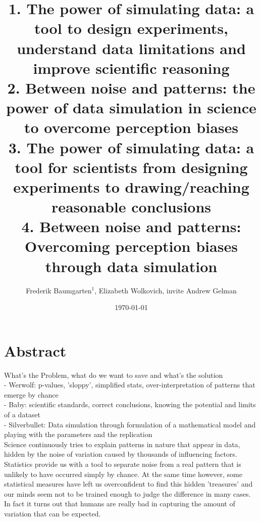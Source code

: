 \documentclass{article}
\begin{document}
\renewcommand{\bibname}{References}%



\title{1. The power of simulating data: a tool to design experiments, understand data limitations and improve scientific reasoning \\%

2. Between noise and patterns: the power of data simulation in science to overcome perception biases\\
3. The power of simulating data: a tool for scientists from designing experiments to drawing/reaching reasonable conclusions\\
4. Between noise and patterns: Overcoming perception biases through data simulation
} 


\date{\today}
\author{Frederik Baumgarten$^1$, Elizabeth Wolkovich, invite Andrew Gelman}
\maketitle 

\section*{Abstract}
What's the Problem, what do we want to save and what's the solution\\
- Werwolf: p-values, 'sloppy', simplified stats, over-interpretation of patterns that emerge by chance\\
- Baby: scientific standards, correct conclusions, knowing the potential and limits of a dataset\\
- Silverbullet: Data simulation through formulation of a mathematical model and playing with the parameters and the replication\\
Science continuously tries to explain patterns in nature that appear in data, hidden by the noise of variation caused by thousands of influencing factors. Statistics provide us with a tool to separate noise from a real pattern that is unlikely to have occurred simply by chance.  At the same time however, some statistical measures have left us overconfident to find this hidden 'treasures' and our minds seem not to be trained enough to judge the difference in many cases. In fact it turns out that humans are really bad in capturing the amount of variation that can be expected. 
\end{document}
